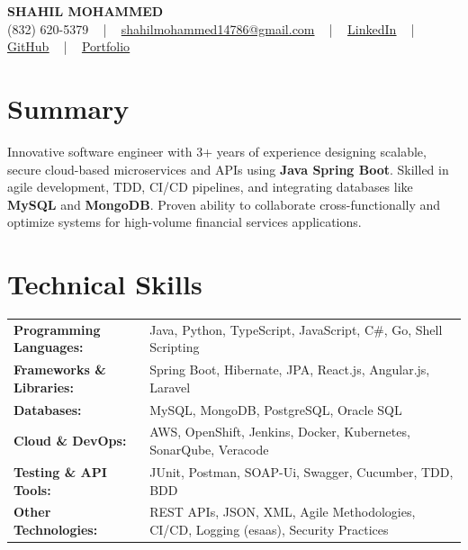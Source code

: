 \documentclass[letterpaper,11pt]{article}
\begin{document}
\begin{center}
    {\fontsize{14pt}{12pt}\selectfont \textbf{\MakeUppercase{Shahil Mohammed}}}\\ \vspace{2pt}
    \fontsize{10pt}{12pt}\selectfont (832) 620-5379 ~ | ~ \href{mailto:shahilmohammed14786@gmail.com}{shahilmohammed14786@gmail.com} ~ | ~  
    \href{https://www.linkedin.com/in/shahil-mohammed-9652931a1/}{\color{blue}\underline{LinkedIn}}  ~ | ~ 
    \href{https://github.com/freakbeast14}{\color{blue}\underline{GitHub}} ~ | ~ 
    \href{https://shahil-mohammed.netlify.app/}{\color{blue}\underline{Portfolio}}
    \vspace{-8pt}
\end{center}

\section{Summary}
\fontsize{9pt}{10pt}\selectfont
Innovative software engineer with 3+ years of experience designing scalable, secure cloud-based microservices and APIs using \textbf{Java Spring Boot}. Skilled in agile development, TDD, CI/CD pipelines, and integrating databases like \textbf{MySQL} and \textbf{MongoDB}. Proven ability to collaborate cross-functionally and optimize systems for high-volume financial services applications.
 \vspace{-5pt}
 
\section{Technical Skills}
        \vspace{-14pt}
        \begin{table}[h]
            \fontsize{9pt}{10pt}\selectfont
            \begin{tabular}{p{0.3\linewidth} p{0.7\linewidth}}
                \textbf{Programming Languages:} & Java, Python, TypeScript, JavaScript, C\#, Go, Shell Scripting \\
                \textbf{Frameworks \& Libraries:} & Spring Boot, Hibernate, JPA, React.js, Angular.js, Laravel \\
                \textbf{Databases:} & MySQL, MongoDB, PostgreSQL, Oracle SQL \\
                \textbf{Cloud \& DevOps:} & AWS, OpenShift, Jenkins, Docker, Kubernetes, SonarQube, Veracode \\
                \textbf{Testing \& API Tools:} & JUnit, Postman, SOAP-Ui, Swagger, Cucumber, TDD, BDD \\
                \textbf{Other Technologies:} & REST APIs, JSON, XML, Agile Methodologies, CI/CD, Logging (esaas), Security Practices \\
            \end{tabular}
        \end{table}
 \vspace{-15pt}
 
\end{document}
